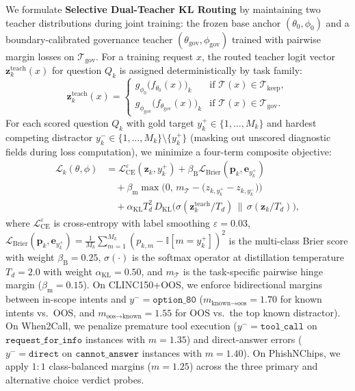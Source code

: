 \documentclass[10pt,twocolumn]{article}
\begin{document}
We formulate \textbf{Selective Dual-Teacher KL Routing} \citep{hinton2015distilling} by maintaining two teacher distributions during joint training: the frozen base anchor $(\theta_0, \phi_0)$ and a boundary-calibrated governance teacher $(\theta_{\text{gov}}, \phi_{\text{gov}})$ trained with pairwise margin losses on $\mathcal{T}_{\text{gov}}$. For a training request $x$, the routed teacher logit vector $\mathbf{z}_k^{\text{teach}}(x)$ for question $Q_k$ is assigned deterministically by task family:
\begin{equation}
    \mathbf{z}_k^{\text{teach}}(x) = \begin{cases}
        g_{\phi_0}\big(f_{\theta_0}(x)\big)_k & \text{if } \mathcal{T}(x) \in \mathcal{T}_{\text{keep}}, \\[4pt]
        g_{\phi_{\text{gov}}}\big(f_{\theta_{\text{gov}}}(x)\big)_k & \text{if } \mathcal{T}(x) \in \mathcal{T}_{\text{gov}}.
    \end{cases}
    \label{eq:dual_teacher}
\end{equation}
For each scored question $Q_k$ with gold target $y_k^+ \in \{1,\dots,M_k\}$ and hardest competing distractor $y_k^- \in \{1,\dots,M_k\} \setminus \{y_k^+\}$ (masking out unscored diagnostic fields during loss computation), we minimize a four-term composite objective:
\begin{align}
    \mathcal{L}_k(\theta, \phi) &= \mathcal{L}_{\text{CE}}^{\varepsilon}(\mathbf{z}_k, y_k^+) + \beta_{\text{B}} \mathcal{L}_{\text{Brier}}(\mathbf{p}_k, \mathbf{e}_{y_k^+}) \nonumber \\
    &\quad + \beta_{\text{m}} \max\!\Big(0,\, m_{\mathcal{T}} - \big(z_{k,y_k^+} - z_{k,y_k^-}\big)\Big) \nonumber \\
    &\quad + \alpha_{\text{KL}} T_d^2 \, D_{\text{KL}}\!\Big(\sigma(\mathbf{z}_k^{\text{teach}} / T_d) \,\Big\|\, \sigma(\mathbf{z}_k / T_d)\Big),
    \label{eq:joint_loss}
\end{align}
where $\mathcal{L}_{\text{CE}}^{\varepsilon}$ is cross-entropy with label smoothing $\varepsilon = 0.03$, $\mathcal{L}_{\text{Brier}}(\mathbf{p}_k, \mathbf{e}_{y_k^+}) = \frac{1}{M_k}\sum_{m=1}^{M_k}(p_{k,m} - \mathbb{I}[m = y_k^+])^2$ is the multi-class Brier score \citep{brier1950verification} with weight $\beta_{\text{B}} = 0.25$, $\sigma(\cdot)$ is the softmax operator at distillation temperature $T_d = 2.0$ with weight $\alpha_{\text{KL}} = 0.50$, and $m_{\mathcal{T}}$ is the task-specific pairwise hinge margin ($\beta_{\text{m}} = 0.15$). On CLINC150+OOS, we enforce bidirectional margins between in-scope intents and $y^- = \texttt{option\_80}$ ($m_{\text{known}\to\text{oos}} = 1.70$ for known intents vs.\ OOS, and $m_{\text{oos}\to\text{known}} = 1.55$ for OOS vs.\ the top known distractor). On When2Call, we penalize premature tool execution ($y^- = \texttt{tool\_call}$ on $\texttt{request\_for\_info}$ instances with $m = 1.35$) and direct-answer errors ($y^- = \texttt{direct}$ on $\texttt{cannot\_answer}$ instances with $m = 1.40$). On PhishNChips, we apply $1:1$ class-balanced margins ($m = 1.25$) across the three primary and alternative choice verdict probes.
\end{document}
